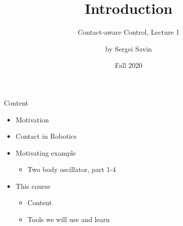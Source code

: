 \documentclass{beamer}
\title{Introduction}
\subtitle{Contact-aware Control, Lecture 1}
\author{by Sergei Savin}
\date{Fall 2020}
\begin{document}
\maketitle


\begin{frame}{Content}

\begin{itemize}
\item Motivation
\item Contact in Robotics
\item Motivating example
\begin{itemize}
\item Two body oscillator, part 1-4
\end{itemize}
\item This course
\begin{itemize}
\item Content
\item Tools we will use and learn
\end{itemize}


\end{itemize}

\end{frame}
\end{document}
